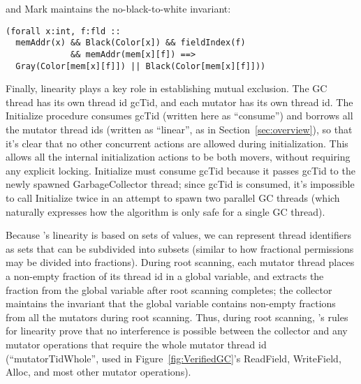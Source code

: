 and Mark maintains the no-black-to-white invariant:

\begin{verbatim}
(forall x:int, f:fld ::
  memAddr(x) && Black(Color[x]) && fieldIndex(f)
             && memAddr(mem[x][f]) ==>
  Gray(Color[mem[x][f]]) || Black(Color[mem[x][f]]))
\end{verbatim}

Finally, linearity plays a key role in establishing mutual exclusion.
The GC thread has its own thread id gcTid, and each mutator has its own thread id.
The Initialize procedure consumes gcTid (written here as ``consume'')
and borrows all the mutator thread ids (written as ``linear'', as in Section~\ref{sec:overview}),
so that it's clear that no other concurrent actions are allowed during initialization.
This allows all the internal initialization actions to be both movers, without requiring any explicit locking.
Initialize must consume gcTid because it passes gcTid to the newly spawned GarbageCollector thread;
since gcTid is consumed, it's impossible to call Initialize twice in an attempt to spawn two parallel GC threads
(which naturally expresses how the algorithm is only safe for a single GC thread).

Because \civl's linearity is based on sets of values,
we can represent thread identifiers as sets that can be subdivided into subsets
(similar to how fractional permissions may be divided into fractions).
During root scanning, each mutator thread places a non-empty fraction of its thread id in a global variable,
and extracts the fraction from the global variable after root scanning completes;
the collector maintains the invariant that the global variable contains non-empty fractions from all the mutators during root scanning.
Thus, during root scanning, \civl's rules for linearity prove that no interference is possible
between the collector and any mutator operations that require the whole mutator thread id
(``mutatorTidWhole'', used in Figure~\ref{fig:VerifiedGC}'s ReadField, WriteField, Alloc,
and most other mutator operations).

